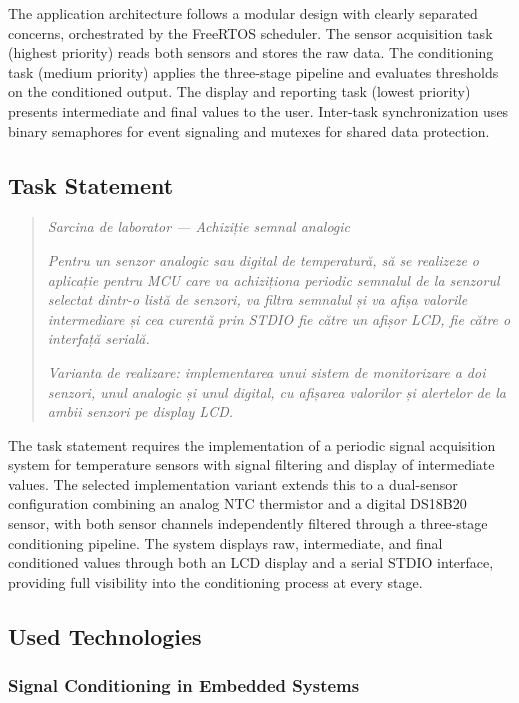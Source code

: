 The application architecture follows a modular design with clearly separated concerns, orchestrated by the FreeRTOS scheduler. The sensor acquisition task (highest priority) reads both sensors and stores the raw data. The conditioning task (medium priority) applies the three-stage pipeline and evaluates thresholds on the conditioned output. The display and reporting task (lowest priority) presents intermediate and final values to the user. Inter-task synchronization uses binary semaphores for event signaling and mutexes for shared data protection.

\subsection{Task Statement}

\begin{quote}
\textit{Sarcina de laborator --- Achiziție semnal analogic}

\textit{Pentru un senzor analogic sau digital de temperatură, să se realizeze o aplicație pentru MCU care va achiziționa periodic semnalul de la senzorul selectat dintr-o listă de senzori, va filtra semnalul și va afișa valorile intermediare și cea curentă prin STDIO fie către un afișor LCD, fie către o interfață serială.}

\textit{Varianta de realizare: implementarea unui sistem de monitorizare a doi senzori, unul analogic și unul digital, cu afișarea valorilor și alertelor de la ambii senzori pe display LCD.}
\end{quote}

The task statement requires the implementation of a periodic signal acquisition system for temperature sensors with signal filtering and display of intermediate values. The selected implementation variant extends this to a dual-sensor configuration combining an analog NTC thermistor and a digital DS18B20 sensor, with both sensor channels independently filtered through a three-stage conditioning pipeline. The system displays raw, intermediate, and final conditioned values through both an LCD display and a serial STDIO interface, providing full visibility into the conditioning process at every stage.

\subsection{Used Technologies}

\subsubsection{Signal Conditioning in Embedded Systems}

